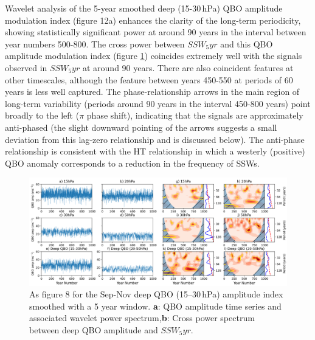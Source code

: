 
Wavelet analysis of the 5-year smoothed deep (15-30\,hPa) QBO amplitude modulation index (figure 12a) enhances the clarity of the long-term periodicity, showing statistically significant power at around 90 years in the interval between year numbers 500-800. The cross power between $SSW_5yr$ and this QBO amplitude modulation index (figure \ref{fig:QBO_SSW_subfig}) coincides extremely well with the signals observed in $SSW_5yr$ at around 90 years. There are also coincident features at other timescales, although the feature between years 450-550 at periods of 60 years is less well captured. The phase-relationship arrows in the main region of long-term variability (periods around 90 years in the interval 450-800 years) point broadly to the left ($\pi$ phase shift), indicating that the signals are approximately anti-phased (the slight downward pointing of the arrows suggests a small deviation from this lag-zero relationship and is discussed below). The anti-phase relationship is consistent with the HT relationship in which a westerly (positive) QBO anomaly corresponds to a reduction in the frequency of SSWs.


\begin{center}
\begin{figure}[h!]
\includegraphics[width = \textwidth]{Figures/Figures-origins/QBO_levels_amp.png}
\caption{As figure 8 for the Sep-Nov deep QBO (15--30\,hPa) amplitude index smoothed with a 5 year window. \textbf{a}: QBO amplitude time series and associated wavelet power spectrum,\textbf{b}: Cross power spectrum between deep QBO amplitude and $SSW_5yr$.}
\label{fig:QBO_SSW_subfig}
\end{figure}
\end{center}



